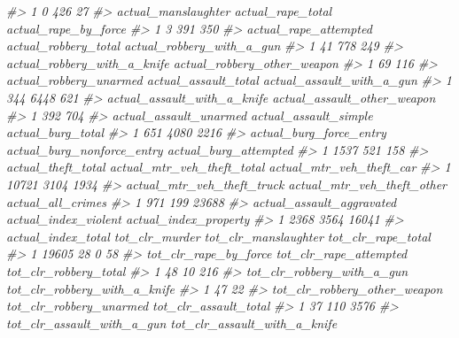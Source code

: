 \documentclass[
  12pt,
]{book}
\newenvironment{Shaded}{\begin{snugshade}}{\end{snugshade}}
\newcommand{\CommentTok}[1]{\textcolor[rgb]{0.37,0.37,0.37}{\textit{#1}}}
\begin{document}
\begin{Shaded}
\begin{Highlighting}[]
\CommentTok{\#> 1                           0                426            27}
\CommentTok{\#>   actual\_manslaughter actual\_rape\_total actual\_rape\_by\_force}
\CommentTok{\#> 1                   3               391                  350}
\CommentTok{\#>   actual\_rape\_attempted actual\_robbery\_total actual\_robbery\_with\_a\_gun}
\CommentTok{\#> 1                    41                  778                       249}
\CommentTok{\#>   actual\_robbery\_with\_a\_knife actual\_robbery\_other\_weapon}
\CommentTok{\#> 1                          69                         116}
\CommentTok{\#>   actual\_robbery\_unarmed actual\_assault\_total actual\_assault\_with\_a\_gun}
\CommentTok{\#> 1                    344                 6448                       621}
\CommentTok{\#>   actual\_assault\_with\_a\_knife actual\_assault\_other\_weapon}
\CommentTok{\#> 1                         392                         704}
\CommentTok{\#>   actual\_assault\_unarmed actual\_assault\_simple actual\_burg\_total}
\CommentTok{\#> 1                    651                  4080              2216}
\CommentTok{\#>   actual\_burg\_force\_entry actual\_burg\_nonforce\_entry actual\_burg\_attempted}
\CommentTok{\#> 1                    1537                        521                   158}
\CommentTok{\#>   actual\_theft\_total actual\_mtr\_veh\_theft\_total actual\_mtr\_veh\_theft\_car}
\CommentTok{\#> 1              10721                       3104                     1934}
\CommentTok{\#>   actual\_mtr\_veh\_theft\_truck actual\_mtr\_veh\_theft\_other actual\_all\_crimes}
\CommentTok{\#> 1                        971                        199             23688}
\CommentTok{\#>   actual\_assault\_aggravated actual\_index\_violent actual\_index\_property}
\CommentTok{\#> 1                      2368                 3564                 16041}
\CommentTok{\#>   actual\_index\_total tot\_clr\_murder tot\_clr\_manslaughter tot\_clr\_rape\_total}
\CommentTok{\#> 1              19605             28                    0                 58}
\CommentTok{\#>   tot\_clr\_rape\_by\_force tot\_clr\_rape\_attempted tot\_clr\_robbery\_total}
\CommentTok{\#> 1                    48                     10                   216}
\CommentTok{\#>   tot\_clr\_robbery\_with\_a\_gun tot\_clr\_robbery\_with\_a\_knife}
\CommentTok{\#> 1                         47                           22}
\CommentTok{\#>   tot\_clr\_robbery\_other\_weapon tot\_clr\_robbery\_unarmed tot\_clr\_assault\_total}
\CommentTok{\#> 1                           37                     110                  3576}
\CommentTok{\#>   tot\_clr\_assault\_with\_a\_gun tot\_clr\_assault\_with\_a\_knife}

\end{Highlighting}
\end{Shaded}
\end{document}
